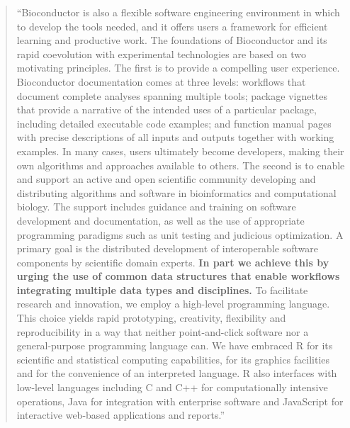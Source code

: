 \documentclass[]{tufte-book}
\begin{document}
\begin{quote}
``Bioconductor is also a flexible software engineering environment in which to
develop the tools needed, and it offers users a framework for efficient learning
and productive work. The foundations of Bioconductor and its rapid coevolution
with experimental technologies are based on two motivating principles. The first
is to provide a compelling user experience. Bioconductor documentation comes at
three levels: workflows that document complete analyses spanning multiple tools;
package vignettes that provide a narrative of the intended uses of a particular
package, including detailed executable code examples; and function manual pages
with precise descriptions of all inputs and outputs together with working
examples. In many cases, users ultimately become developers, making their own
algorithms and approaches available to others. The second is to enable and
support an active and open scientific community developing and distributing
algorithms and software in bioinformatics and computational biology. The support
includes guidance and training on software development and documentation, as
well as the use of appropriate programming paradigms such as unit testing and
judicious optimization. A primary goal is the distributed development of
interoperable software components by scientific domain experts. \textbf{In part we
achieve this by urging the use of common data structures that enable workflows
integrating multiple data types and disciplines.} To facilitate research and
innovation, we employ a high-level programming language. This choice yields
rapid prototyping, creativity, flexibility and reproducibility in a way that
neither point-and-click software nor a general-purpose programming language can.
We have embraced R for its scientific and statistical computing capabilities,
for its graphics facilities and for the convenience of an interpreted language.
R also interfaces with low-level languages including C and C++ for
computationally intensive operations, Java for integration with enterprise
software and JavaScript for interactive web-based applications and reports.''
\citep{huber2015orchestrating}
\end{quote}
\end{document}
